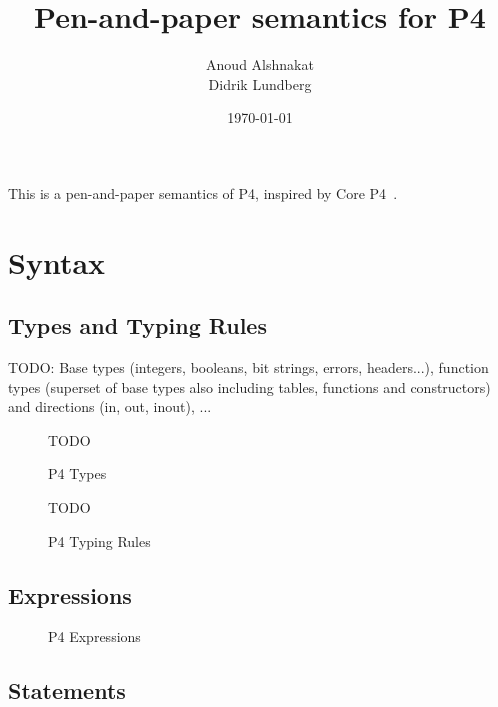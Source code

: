 \documentclass[UTF8]{article}
\title{%
Pen-and-paper semantics for P4}
\author{Anoud Alshnakat\\
Didrik Lundberg
}
\date{\today}
\begin{document}
\maketitle
\noindent
This is a pen-and-paper semantics of P4, inspired by Core P4~\cite{doenges2021petr4}.

\section{Syntax}
\subsection{Types and Typing Rules}
%
TODO: Base types (integers, booleans, bit strings, errors, headers...), function types (superset of base types also including tables, functions and constructors) and directions (in, out, inout), ...
%
\begin{figure}[h!]
\centering
TODO
\caption{P4 Types}
\end{figure}
%
\begin{figure}[h!]
\centering
TODO
\caption{P4 Typing Rules}
\end{figure}
%
\newpage
\subsection{Expressions}
%
%
%
%
\begin{figure}[h!]
\centering\ottgrammartabular{
\ottexp\ottafterlastrule
}
\caption{P4 Expressions}
\label{fig:exp}
\end{figure}
%
\newpage
\subsection{Statements}
\end{document}
